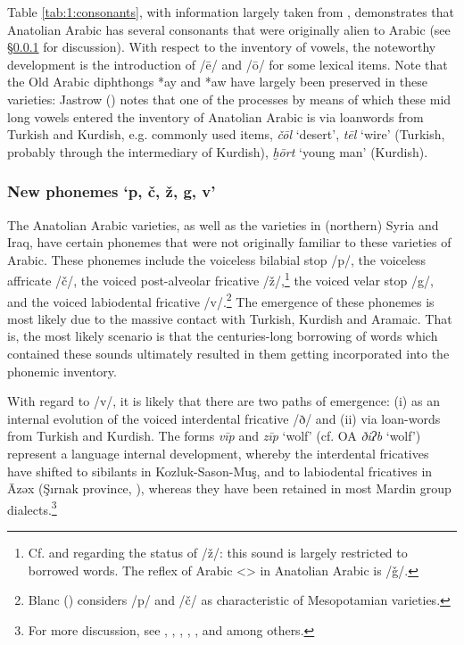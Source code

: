 \documentclass[output=paper]{langsci/langscibook}
\begin{document}
Table \ref{tab:1:consonants}, with information largely taken from \cite{Jastrow2011anatolian}, demonstrates that Anatolian Arabic has several consonants that were originally alien to Arabic (see §\ref{newsounds} for discussion). With respect to the inventory of vowels, the noteworthy development is the introduction of /\={e}/ and /\={o}/ for some lexical items. Note that the Old Arabic diphthongs *ay and *aw have largely been preserved in these varieties: Jastrow (\citeyear[89]{Jastrow2011anatolian}) notes that one of the processes by means of which these mid long vowels entered the inventory of Anatolian Arabic is via loanwords from Turkish and Kurdish, e.g. commonly used items, \textit{\v{c}\={o}l} `desert', \textit{t\={e}l} `wire' (Turkish, probably through the intermediary of Kurdish), \textit{ḫ\={o}rt} `young man' (Kurdish).  


\subsubsection{New phonemes `p, \v{c}, ž, g, v'}\label{newsounds}
The Anatolian Arabic varieties, as well as the varieties in (northern) Syria and Iraq, have certain phonemes that were not originally familiar to these varieties of Arabic. These phonemes include the voiceless bilabial stop /p/, the voiceless affricate /\v{c}/, the voiced post-alveolar fricative /ž/,\footnote{Cf. \cite{Jastrow2011anatolian} and \cite{GrigoreBituna2012} regarding the status of /ž/: this sound is largely restricted to borrowed words. The reflex of Arabic <{}> in Anatolian Arabic is /\v{g}/.} the voiced velar stop /g/, and the voiced labiodental fricative /v/.\footnote{Blanc (\citeyear[6--7]{Blanc1964}) considers /p/ and /\v{c}/ as characteristic of Mesopotamian varieties.} The emergence of these phonemes is most likely due to the massive contact with Turkish, Kurdish and Aramaic. That is, the most likely scenario is that the centuries-long borrowing of words which contained these sounds ultimately resulted in them getting incorporated into the phonemic inventory. 


With regard to /v/, it is likely that there are two paths of emergence: (i) as an internal evolution of the voiced interdental fricative /ð/ and (ii) via loan-words from Turkish and Kurdish. The forms \textit{vīp} and \textit{zīp} `wolf' (cf. OA \textit{ðiʔb} `wolf') represent a language internal development, whereby the interdental fricatives have shifted to sibilants in Kozluk-Sason-Mu\c{s}, and to labiodental fricatives in \={A}zəx (\c{S}{\i}rnak province, \citealt{Wittrich2001}), whereas they have been retained in most Mardin group dialects.\footnote{For more discussion, see \citet{Wittrich2001}, \citet{Jastrow2011anatolian}, \citet{Grigore2007article}, \citet{Talay2011}, \citet{Akkus2017}, and \cite{Bituna2016} among others. } 
\end{document}
